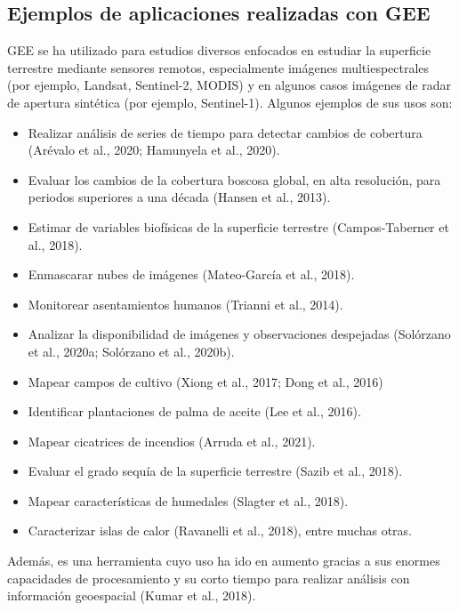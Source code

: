 \documentclass[
  12pt,
  letterpaper,
  twoside]{book}
\providecommand{\tightlist}{%
  \setlength{\itemsep}{0pt}\setlength{\parskip}{0pt}}
\begin{document}
\hypertarget{ejemplos-de-aplicaciones-realizadas-con-gee}{%
\subsection{Ejemplos de aplicaciones realizadas con GEE}\label{ejemplos-de-aplicaciones-realizadas-con-gee}}

GEE se ha utilizado para estudios diversos enfocados en estudiar la superficie terrestre mediante sensores remotos, especialmente imágenes multiespectrales (por ejemplo, Landsat, Sentinel-2, MODIS) y en algunos casos imágenes de radar de apertura sintética (por ejemplo, Sentinel-1). Algunos ejemplos de sus usos son:

\begin{itemize}
\tightlist
\item
  Realizar análisis de series de tiempo para detectar cambios de cobertura (Arévalo et al., 2020; Hamunyela et al., 2020).
\item
  Evaluar los cambios de la cobertura boscosa global, en alta resolución, para periodos superiores a una década (Hansen et al., 2013).
\item
  Estimar de variables biofísicas de la superficie terrestre (Campos-Taberner et al., 2018).
\item
  Enmascarar nubes de imágenes (Mateo-García et al., 2018).
\item
  Monitorear asentamientos humanos (Trianni et al., 2014).
\item
  Analizar la disponibilidad de imágenes y observaciones despejadas (Solórzano et al., 2020a; Solórzano et al., 2020b).
\item
  Mapear campos de cultivo (Xiong et al., 2017; Dong et al., 2016)
\item
  Identificar plantaciones de palma de aceite (Lee et al., 2016).
\item
  Mapear cicatrices de incendios (Arruda et al., 2021).
\item
  Evaluar el grado sequía de la superficie terrestre (Sazib et al., 2018).
\item
  Mapear características de humedales (Slagter et al., 2018).
\item
  Caracterizar islas de calor (Ravanelli et al., 2018), entre muchas otras.
\end{itemize}

Además, es una herramienta cuyo uso ha ido en aumento gracias a sus enormes capacidades de procesamiento y su corto tiempo para realizar análisis con información geoespacial (Kumar et al., 2018).
\end{document}

